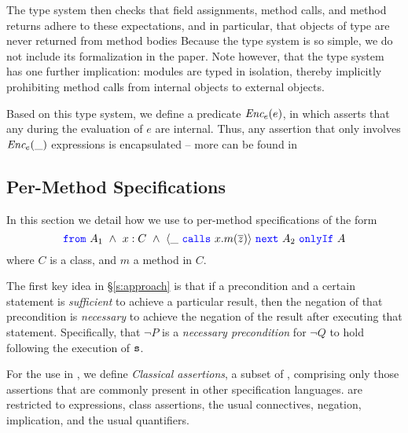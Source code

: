 The type system then checks 
that field assignments, method calls, and method returns adhere to these expectations,
and in particular, that objects of \enclosed type
are never returned from method bodies 
Because the type system is so simple, we do not include its formalization in the paper.
Note however, that the type system has one further implication: modules are typed 
in isolation, thereby implicitly prohibiting
method calls from internal objects to external objects. 

Based on this type system, we define a predicate $\textit{Enc$_e$}(e)$, in 
which asserts that any  during the evaluation of $e$ are internal.
Thus, any assertion that only involves $\textit{Enc$_e$}(\_)$ expressions is encapsulated -- more can be found in 

\subsection{Per-Method \Nec Specifications}
\label{s:classical-proof}
In this section we detail how we use \funcSpecs
to  per-method \Nec specifications  
of the form 
$$\onlyIfSingle{A_1\ \wedge\ x : C\ \wedge\ \calls{\_}{x}{m}{\overline{z}}}{A_2}{A}$$
where $C$ is a class, and $m$ a method in $C$.


The first key idea in \S \ref{s:approach}
is that if a precondition and a certain statement is \emph{sufficient}
to achieve a particular result, %
then the negation of that precondition
is \emph{necessary} to achieve the negation of the result after executing that statement.
Specifically, 
  that $\neg P$ is a \emph{necessary precondition} for $\neg Q$ to 
hold following the execution of ${\texttt{s}}$.

For the use in \funcSpecs, we define \emph{Classical assertions}, a subset of \SpecO, comprising only those 
assertions that are commonly present in other specification languages.
 are restricted to expressions, class assertions, the usual connectives, negation, 
implication, and the usual quantifiers.


